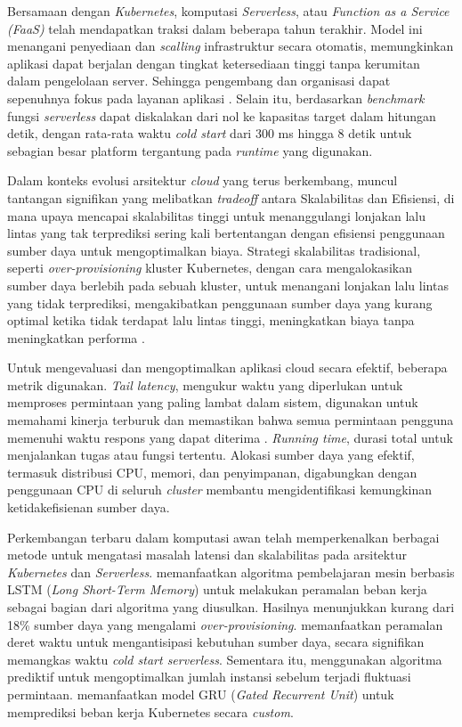 Bersamaan dengan \emph{Kubernetes}, komputasi \emph{Serverless}, atau \emph{Function as a Service (FaaS)} telah mendapatkan traksi dalam beberapa tahun terakhir. Model ini menangani penyediaan dan \emph{scalling} infrastruktur secara otomatis, memungkinkan aplikasi dapat berjalan dengan tingkat ketersediaan tinggi tanpa kerumitan dalam pengelolaan server. Sehingga pengembang dan organisasi dapat sepenuhnya fokus pada layanan aplikasi \citep{sadaqat2018serverless, savage2018going, sewak2018winning}. Selain itu, berdasarkan \emph{benchmark} \citet{yu2020characterizing} fungsi \emph{serverless} dapat diskalakan dari nol ke kapasitas target dalam hitungan detik, dengan rata-rata waktu \emph{cold start} dari 300 ms hingga 8 detik untuk sebagian besar platform tergantung pada \emph{runtime} yang digunakan.

Dalam konteks evolusi arsitektur \emph{cloud} yang terus berkembang, muncul tantangan signifikan yang melibatkan \emph{tradeoff} antara Skalabilitas dan Efisiensi, di mana upaya mencapai skalabilitas tinggi untuk menanggulangi lonjakan lalu lintas yang tak terprediksi sering kali bertentangan dengan efisiensi penggunaan sumber daya untuk mengoptimalkan biaya. Strategi skalabilitas tradisional, seperti \emph{over-provisioning} kluster Kubernetes, dengan cara mengalokasikan sumber daya berlebih pada sebuah kluster, untuk menangani lonjakan lalu lintas yang tidak terprediksi, mengakibatkan penggunaan sumber daya yang kurang optimal ketika tidak terdapat lalu lintas tinggi, meningkatkan biaya tanpa meningkatkan performa \citep{zhang2021zeus}.

Untuk mengevaluasi dan mengoptimalkan aplikasi cloud secara efektif, beberapa metrik digunakan. \emph{Tail latency}, mengukur waktu yang diperlukan untuk memproses permintaan yang paling lambat dalam sistem, digunakan untuk memahami kinerja terburuk dan memastikan bahwa semua permintaan pengguna memenuhi waktu respons yang dapat diterima \citep{aslanpour2020performance}. \emph{Running time}, durasi total untuk menjalankan tugas atau fungsi tertentu. Alokasi sumber daya yang efektif, termasuk distribusi CPU, memori, dan penyimpanan, digabungkan dengan penggunaan CPU di seluruh \emph{cluster} membantu mengidentifikasi kemungkinan ketidakefisienan sumber daya.

Perkembangan terbaru dalam komputasi awan telah memperkenalkan berbagai metode untuk mengatasi masalah latensi dan skalabilitas pada arsitektur \emph{Kubernetes} dan \emph{Serverless}. \citet{yang2019elax} memanfaatkan algoritma pembelajaran mesin berbasis LSTM (\emph{Long Short-Term Memory}) untuk melakukan peramalan beban kerja sebagai bagian dari algoritma yang diusulkan. Hasilnya menunjukkan kurang dari 18\% sumber daya yang mengalami \emph{over-provisioning}. \citet{yuan2024time} memanfaatkan peramalan deret waktu untuk mengantisipasi kebutuhan sumber daya, secara signifikan memangkas waktu \emph{cold start serverless}. Sementara itu, \citet{he2020novel} menggunakan algoritma prediktif untuk mengoptimalkan jumlah instansi sebelum terjadi fluktuasi permintaan. \citet{mondal2023toward} memanfaatkan model GRU (\emph{Gated Recurrent Unit}) untuk memprediksi beban kerja Kubernetes secara \emph{custom}.

